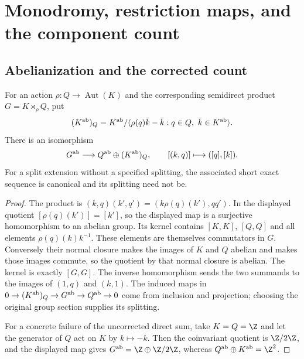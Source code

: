 \section{Monodromy, restriction maps, and the component count}

\subsection{Abelianization and the corrected count}

\begin{proposition}[D.1.1; Proved]\label{st:D.1.1}
For an action $\rho:Q\to\operatorname{Aut}(K)$ and the corresponding
semidirect product $G=K\rtimes_\rho Q$, put
\[
(K^{\rm ab})_Q=K^{\rm ab}/
\langle\rho(q)\bar k-\bar k:q\in Q,\ \bar k\in K^{\rm ab}\rangle.
\]
There is an isomorphism
\[
G^{\rm ab}\longrightarrow Q^{\rm ab}\oplus(K^{\rm ab})_Q,
\qquad [(k,q)]\longmapsto([q],[k]).
\]
For a split extension without a specified splitting, the associated
short exact sequence is canonical and its splitting need not be.
\end{proposition}
\begin{proof}
The product is $(k,q)(k',q')=(k\rho(q)(k'),qq')$.
In the displayed quotient $[\rho(q)(k')]=[k']$, so the displayed map
is a surjective homomorphism to an abelian group. Its kernel contains
$[K,K]$, $[Q,Q]$ and all elements $\rho(q)(k)k^{-1}$.
These elements are themselves commutators in $G$. Conversely their
normal closure makes the images of $K$ and $Q$ abelian and makes
those images commute, so the quotient by that normal closure is
abelian. The kernel is exactly $[G,G]$. The inverse homomorphism
sends the two summands to the images of $(1,q)$ and $(k,1)$.
The induced maps in
$0\to(K^{\rm ab})_Q\to G^{\rm ab}\to Q^{\rm ab}\to0$
come from inclusion and projection; choosing the original group
section supplies its splitting.

For a concrete failure of the uncorrected direct sum, take
$K=Q=\Z$ and let the generator of $Q$ act on $K$ by $k\mapsto-k$.
Then the coinvariant quotient is $\Z/2\Z$, and the displayed map
gives $G^{\rm ab}=\Z\oplus\Z/2\Z$, whereas
$Q^{\rm ab}\oplus K^{\rm ab}=\Z^2$.
\end{proof}

